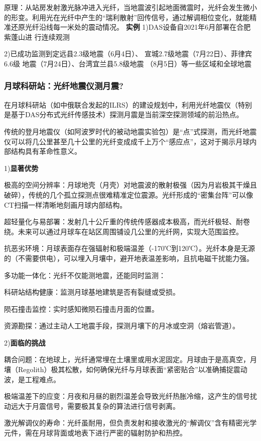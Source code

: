 \documentclass[12pt,a4paper]{article}
\begin{document}
	原理：从站房发射激光脉冲进入光纤，当地震波引起地面微震时，光纤会发生微小的形变。利用光在光纤中产生的“瑞利散射”回传信号，通过解调相位变化，就能精准还原光纤沿线每一米处的震动情况。
	\textbf{实例}
	1)DAS设备自2021年6月部署在合肥紫蓬山进
	行连续观测
	
	2)已成功监测到定远县2.3级地震（6月4日）、
	宣城2.7级地震（7月22日）、菲律宾6.6级
	地震（7月24日）、台湾宜兰县5.8级地震
	（8月5日）等一些区域和全球地震
	\subsubsection{月球科研站：光纤地震仪测月震?}
	在月球科研站（如中俄联合发起的ILRS）的建设规划中，利用光纤地震仪（特别是基于DAS分布式光纤传感技术）探测月震是当前深空探测领域的前沿热点。
	
	传统的登月地震仪（如阿波罗时代的被动地震实验包）是“点”式探测，而光纤地震仪可以将几公里甚至几十公里的光纤变成成千上万个“感应点”，这对于揭示月球内部结构具有革命性意义。
	
	1)\textbf{显著优势}
	
	极高的空间分辨率：月球地壳（月壳）对地震波的散射极强（因为月岩极其干燥且破碎），传统的几个孤立探测点很难精准定位震源。光纤形成的“密集台阵”可以像CT扫描一样清晰地刻画月球内部结构。
	
	超轻量化与易部署：发射几十公斤重的传统传感器成本极高，而光纤极轻、耐卷绕。未来可以通过月球车在站区周围铺设几公里的光纤网，实现大范围监控。
	
	抗恶劣环境：月球表面存在强辐射和极端温差（-170℃到120℃）。光纤本身是无源的（不需要供电），可以埋入月壤中，避开地表温差影响，且抗电磁干扰能力强。
	
	多功能一体化：光纤不仅能测地震，还能同时监测：
	
	科研站结构健康：监测月球基地建筑是否有裂缝或受损。
	
	陨石撞击监控：实时感知微陨石撞击月面的位置。
	
	资源勘探：通过主动人工地震手段，探测月壤下的月冰或空洞（熔岩管道）。
	
	2)\textbf{面临的挑战}
	
	耦合问题：在地球上，光纤通常埋在土壤里或用水泥固定。月球由于是高真空，月壤（Regolith）极其松散，如何确保光纤与月球表面“紧密贴合”以准确捕捉震动波，是工程难点。
	
	极端温差下的应变：月夜和月昼的剧烈温差会导致光纤热胀冷缩，这产生的信号扰动远大于月震信号，需要极其复杂的算法进行信号剥离。
	
	激光解调仪的寿命：光纤虽耐用，但负责发射和接收激光的“解调仪”含有精密光学元件，需在月球背面或地表下进行严密的辐射防护和热控。
\end{document}
